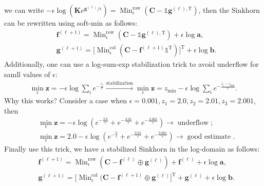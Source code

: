 \documentclass[11pt]{book}
\begin{document}
we can write $-\epsilon \log(\mathbf{K}e^{\mathbf{g}^{(\ell)}/\epsilon}) = \operatorname{Min}_{\epsilon}^{\operatorname{row}}(\mathbf{C}-\mathbb{1}\mathbf{g}^{(\ell),\mathrm{T}})$, then the Sinkhorn can be rewritten using soft-min as follows:
\begin{align}
    &\mathbf{f}^{(\ell+1)} = \operatorname{Min}_{\epsilon}^{\operatorname{row}}(\mathbf{C}-\mathbb{1}\mathbf{g}^{(\ell),\mathrm{T}}) + \epsilon\log\mathbf{a}, \\
    &\mathbf{g}^{(\ell+1)} = \Big[\operatorname{Min}_{\epsilon}^{\operatorname{col}}(\mathbf{C}-\mathbf{f}^{(\ell+1)}\mathbb{1}^{\mathrm{T}}) \Big]^{\mathrm{T}} + \epsilon\log\mathbf{b}.
\end{align}
Additionally, one can use a log-sum-exp stabilization trick to avoid underflow for samll values of $\epsilon$:
\begin{align*}
    \min_{\epsilon} \mathbf{z} = -\epsilon \log \sum_i e^{-\frac{z_i}{\epsilon}} \xrightarrow{\text{stabilization}}
    \min_{\epsilon} \mathbf{z} = z_{\min}-\epsilon \log \sum_i e^{-\frac{z_i-z_{\min}}{\epsilon}}.
\end{align*}
Why this works? Consider a case when $\epsilon = 0.001, z_1= 2.0, z_2 = 2.01, z_3 = 2.001$, then
\begin{align*}
    &\min_{\epsilon}\mathbf{z} = -\epsilon \log \left( e^{-\frac{2.0}{\epsilon}} + e^{-\frac{2.01}{\epsilon}} + e^{-\frac{2.001}{\epsilon}}\right) \rightarrow \operatorname{underflow}; \\
    &\min_{\epsilon}\mathbf{z} = 2.0 -\epsilon \log \left( e^{-\frac{0}{\epsilon}} + e^{-\frac{0.01}{\epsilon}} + e^{-\frac{0.001}{\epsilon}}\right) \rightarrow \operatorname{good\ estimate}.
\end{align*}
Finally use this trick, we have a stabilized Sinkhorn in the log-domain as follows:
\begin{align}
    &\mathbf{f}^{(\ell+1)} = \operatorname{Min}_{\epsilon}^{\operatorname{row}}(\mathbf{C}- \mathbf{f}^{(\ell)}\oplus\mathbf{g}^{(\ell)}) + \mathbf{f}^{(\ell)} + \epsilon\log\mathbf{a}, \\
    &\mathbf{g}^{(\ell+1)} = \Big[\operatorname{Min}_{\epsilon}^{\operatorname{col}}(\mathbf{C}-\mathbf{f}^{(\ell+1)}\oplus\mathbf{g}^{(\ell)} \Big]^{\mathrm{T}} + \mathbf{g}^{(\ell)} + \epsilon\log\mathbf{b}.
\end{align}
\end{document}
